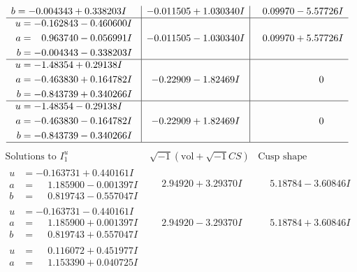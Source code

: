 \documentclass[1p]{elsarticle_modified}
\theoremstyle{definition}
\newcommand{\I}{\sqrt{-1}}
\begin{document}
$$\begin{array}{c|c|c}
\begin{aligned}
b &= -0.004343 + 0.338203 I\end{aligned}
 & -0.011505 + 1.030340 I & \phantom{-}0.09970 - 5.57726 I \\ \hline\begin{aligned}
u &= -0.162843 - 0.460600 I \\
a &= \phantom{-}0.963740 - 0.056991 I \\
b &= -0.004343 - 0.338203 I\end{aligned}
 & -0.011505 - 1.030340 I & \phantom{-}0.09970 + 5.57726 I \\ \hline\begin{aligned}
u &= -1.48354 + 0.29138 I \\
a &= -0.463830 + 0.164782 I \\
b &= -0.843739 + 0.340266 I\end{aligned}
 & -0.22909 - 1.82469 I & \phantom{-0.000000 } 0 \\ \hline\begin{aligned}
u &= -1.48354 - 0.29138 I \\
a &= -0.463830 - 0.164782 I \\
b &= -0.843739 - 0.340266 I\end{aligned}
 & -0.22909 + 1.82469 I & \phantom{-0.000000 } 0\\
 \hline 
 \end{array}$$\newpage$$\begin{array}{c|c|c}  
\text{Solutions to }I^u_{1}& \I (\text{vol} + \sqrt{-1}CS) & \text{Cusp shape}\\
 \hline 
\begin{aligned}
u &= -0.163731 + 0.440161 I \\
a &= \phantom{-}1.185900 - 0.001397 I \\
b &= \phantom{-}0.819743 - 0.557047 I\end{aligned}
 & \phantom{-}2.94920 + 3.29370 I & \phantom{-}5.18784 - 3.60846 I \\ \hline\begin{aligned}
u &= -0.163731 - 0.440161 I \\
a &= \phantom{-}1.185900 + 0.001397 I \\
b &= \phantom{-}0.819743 + 0.557047 I\end{aligned}
 & \phantom{-}2.94920 - 3.29370 I & \phantom{-}5.18784 + 3.60846 I \\ \hline\begin{aligned}
u &= \phantom{-}0.116072 + 0.451977 I \\
a &= \phantom{-}1.153390 + 0.040725 I \\

\end{aligned}
\end{array}$$
\end{document}
